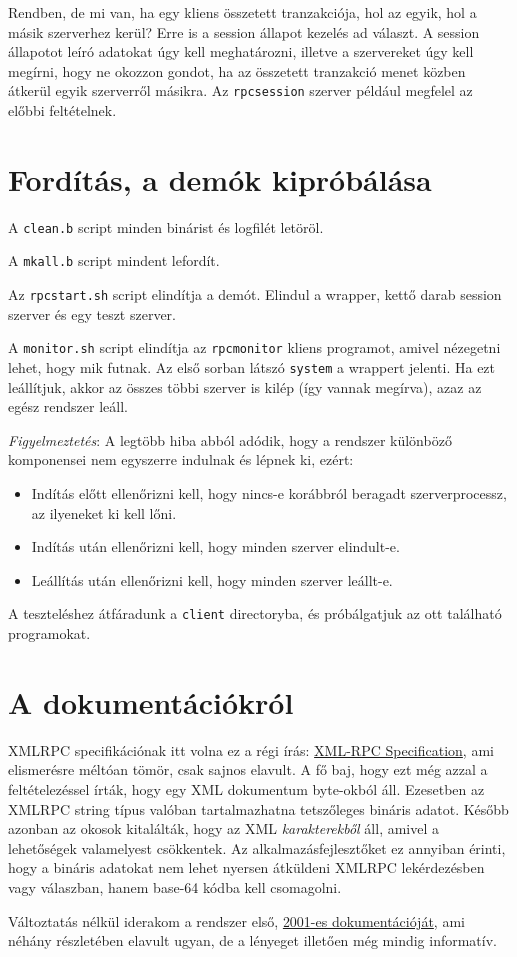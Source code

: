 Rendben, de mi van, ha egy kliens összetett tranzakciója, 
hol az egyik, hol a másik szerverhez kerül?
Erre is a session állapot kezelés ad választ. A session állapotot
leíró adatokat úgy kell meghatározni, illetve a szervereket úgy kell
megírni, hogy ne okozzon gondot, ha az összetett tranzakció menet
közben átkerül egyik szerverről másikra.
Az {\tt rpcsession} szerver például megfelel az előbbi feltételnek.


\section{Fordítás, a demók kipróbálása}

A {\tt clean.b} script minden binárist és logfilét letöröl.

A {\tt mkall.b} script mindent lefordít.


Az {\tt rpcstart.sh} script elindítja a demót. 
Elindul a wrapper, kettő darab session szerver és egy teszt szerver.

A {\tt monitor.sh} script elindítja az {\tt rpcmonitor} kliens programot,
amivel nézegetni lehet, hogy mik futnak.     
Az első sorban látszó {\tt system} a wrappert jelenti.
Ha ezt leállítjuk, akkor az összes többi szerver is kilép 
(így vannak megírva), azaz az egész rendszer leáll.
    
{\em Figyelmeztetés}: 
    A legtöbb hiba abból adódik, hogy a rendszer különböző 
    komponensei nem egyszerre indulnak és lépnek ki, ezért: 
\begin{itemize}
\item Indítás előtt ellenőrizni kell,
       hogy nincs-e korábbról beragadt szerverprocessz,
       az ilyeneket ki kell lőni. 
\item Indítás után ellenőrizni kell, hogy minden szerver elindult-e.
\item Leállítás után ellenőrizni kell,  hogy minden szerver leállt-e.
\end{itemize}

A teszteléshez átfáradunk a {\tt client} directoryba, és próbálgatjuk 
az ott található programokat.



\section{A dokumentációkról}

XMLRPC specifikációnak itt volna ez a régi írás:
\href{xmlrpc-spec.htm}{XML-RPC Specification},
ami elismerésre méltóan tömör, csak sajnos elavult.
A fő baj, hogy ezt még azzal a feltételezéssel írták, 
hogy egy XML dokumentum byte-okból áll. Ezesetben
az XMLRPC string típus valóban tartalmazhatna tetszőleges
bináris adatot. Később azonban az okosok kitalálták,
hogy az XML {\em karakterekből\/} áll, amivel a lehetőségek
valamelyest csökkentek. Az alkalmazásfejlesztőket ez annyiban
érinti, hogy a bináris adatokat nem lehet nyersen átküldeni
XMLRPC lekérdezésben vagy válaszban, hanem base-64 kódba
kell csomagolni.


Változtatás nélkül iderakom a rendszer első, 
\href{xmlrpckonto.html}{2001-es dokumentációját},
ami néhány részletében elavult ugyan, 
de a lényeget illetően még mindig informatív.



    